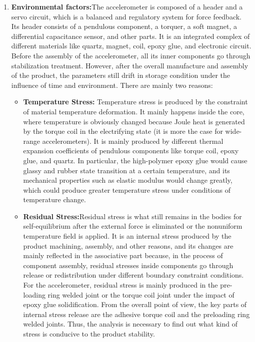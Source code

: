\documentclass{FR16}
\begin{document}
\begin{enumerate}
    
    \item \textbf{Environmental factors:}The accelerometer is composed of a header and a servo circuit, which is a balanced and regulatory system for force feedback. Its header consists of a pendulous component, a torquer, a soft magnet, a differential capacitance sensor, and other parts. It is an integrated complex of different materials like quartz, magnet, coil, epoxy glue, and electronic circuit. Before the assembly of the accelerometer, all its inner components go through stabilization treatment. However, after the overall manufacture and assembly of the product, the parameters still drift in storage condition under the influence of time and environment. There are mainly two reasons:
        \begin{itemize}
            \item \textbf{Temperature Stress:} Temperature stress is produced by the constraint of material
temperature deformation. It mainly happens inside the core,
where temperature is obviously changed because Joule heat is
generated by the torque coil in the electrifying state (it is more the case for wide-range accelerometers). It is mainly produced by different thermal expansion coefficients of pendulous components like torque coil, epoxy glue, and quartz. In particular, the high-polymer epoxy glue would cause glassy and rubber state transition at a certain temperature, and its mechanical properties such as elastic modulus would change greatly, which could produce greater temperature stress under conditions of temperature change.
            \item \textbf{Residual Stress:}Residual stress is what still remains in the bodies for
self-equilibrium after the external force is eliminated or the
nonuniform temperature field is applied. It is an internal stress produced by the product machining, assembly, and other reasons, and its changes are mainly reflected in the associative
part because, in the process of component assembly, residual
stresses inside components go through release or redistribution under different boundary constraint conditions. For the
accelerometer, residual stress is mainly produced in the pre-loading ring welded joint or the torque coil joint under the
impact of epoxy glue solidification.
From the overall point of view, the key parts of internal stress
release are the adhesive torque coil and the preloading ring
welded joints. Thus, the analysis is necessary to find out what
kind of stress is conducive to the product stability.
    \end{itemize}
     
     
     
\end{enumerate}
\end{document}
